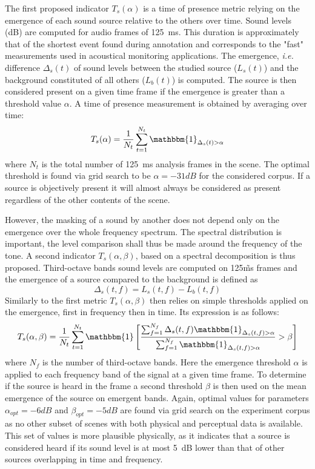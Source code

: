 \documentclass{article}
\begin{document}
\begin{sloppy}
The first proposed indicator $T_s(\alpha)$ is a time of presence metric relying on the emergence of each sound source relative to the others over time. Sound levels (dB) are computed for audio frames of 125~ms. This duration is approximately that of the shortest event found during annotation and corresponds to the "fast" measurements used in acoustical monitoring applications. The emergence, \textit{i.e.} difference $\Delta_s(t)$ of sound levels between the studied source ($L_s(t)$) and the background constituted of all others ($L_b(t)$) is computed. The source is then considered present on a given time frame if the emergence is greater than a threshold value $\alpha$. A time of presence measurement is obtained by averaging over time:
\begin{equation}
T_s(\alpha) = \frac{1}{N_t}\sum_{t = 1}^{N_t}\mathbbm{1}_{\Delta_s(t)>\alpha}
\end{equation}
where $N_t$ is the total number of 125~ms analysis frames in the scene. The optimal threshold is found via grid search to be $\alpha = -31dB$ for the considered corpus. If a source is objectively present it will almost always be considered as present regardless of the other contents of the scene.



However, the masking of a sound by another does not depend only on the emergence over the whole frequency spectrum. The spectral distribution is important, the level comparison shall thus be made around the frequency of the tone. A second indicator $T_s(\alpha, \beta)$, based on a spectral decomposition is thus proposed. Third-octave bands sound levels are computed on 125\~ms frames and the emergence of a source compared to the background is defined as
\begin{equation}
\Delta_s(t, f) = L_s(t, f) - L_b(t, f)
\end{equation}
Similarly to the first metric $T_s(\alpha, \beta)$ then relies on simple thresholds applied on the emergence, first in frequency then in time. Its expression is as follows:
\begin{equation}
T_s(\alpha, \beta) = \frac{1}{N_t}\sum_{t = 1}^{N_t}\mathbbm{1}\left[ \frac{\sum_{f = 1}^{N_f}\Delta_s(t, f)\mathbbm{1}_{\Delta_s(t, f)>\alpha}}{\sum_{f = 1}^{N_f}\mathbbm{1}_{\Delta_s(t, f)>\alpha}}>\beta \right]
\end{equation}
where $N_f$ is the number of third-octave bands. Here the emergence threshold $\alpha$ is applied to each frequency band of the signal at a given time frame. To determine if the source is heard in the frame a second threshold $\beta$ is then used on the mean emergence of the source on emergent bands. Again, optimal values for parameters $\alpha_{opt} = -6 dB$ and $\beta_{opt} = -5 dB$ are found via grid search on the experiment corpus as no other subset of scenes with both physical and perceptual data is available. This set of values is more plausible physically, as it indicates that a source is considered heard if its sound level is at most 5~dB lower than that of other sources overlapping in time and frequency.


\end{sloppy}
\end{document}
